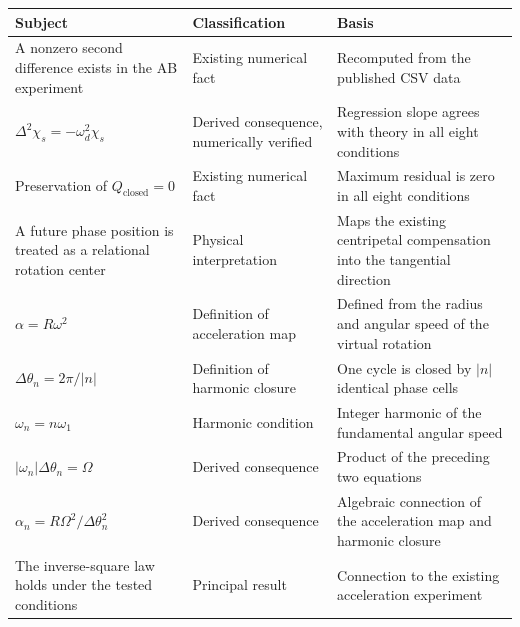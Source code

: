 \documentclass[
  a4paper,
]{article}
\newcounter{none} %
\begin{document}
{\def\LTcaptype{none} %
\begin{longtable}[]{@{}
  >{\raggedright\arraybackslash}p{}
  >{\raggedright\arraybackslash}p{}
  >{\raggedright\arraybackslash}p{}@{}}
\toprule\noalign{}
\begin{minipage}[b]{\linewidth}\raggedright
Subject
\end{minipage} & \begin{minipage}[b]{\linewidth}\raggedright
Classification
\end{minipage} & \begin{minipage}[b]{\linewidth}\raggedright
Basis
\end{minipage} \\
\midrule\noalign{}
\endhead
\bottomrule\noalign{}
\endlastfoot
A nonzero second difference exists in the AB experiment & Existing
numerical fact & Recomputed from the published CSV data \\
\(\Delta^2\chi_s=-\omega_d^2\chi_s\) & Derived consequence, numerically
verified & Regression slope agrees with theory in all eight
conditions \\
Preservation of \(Q_{\mathrm{closed}}=0\) & Existing numerical fact &
Maximum residual is zero in all eight conditions \\
A future phase position is treated as a relational rotation center &
Physical interpretation & Maps the existing centripetal compensation
into the tangential direction \\
\(\alpha=R\omega^2\) & Definition of acceleration map & Defined from the
radius and angular speed of the virtual rotation \\
\(\Delta\theta_n=2\pi/\lvert n\rvert\) & Definition of harmonic closure
& One cycle is closed by \(\lvert n\rvert\) identical phase cells \\
\(\omega_n=n\omega_1\) & Harmonic condition & Integer harmonic of the
fundamental angular speed \\
\(\lvert\omega_n\rvert\Delta\theta_n=\Omega\) & Derived consequence &
Product of the preceding two equations \\
\(\alpha_n=R\Omega^2/\Delta\theta_n^2\) & Derived consequence &
Algebraic connection of the acceleration map and harmonic closure \\
The inverse-square law holds under the tested conditions & Principal
result & Connection to the existing acceleration experiment \\

\end{longtable}}
\end{document}
